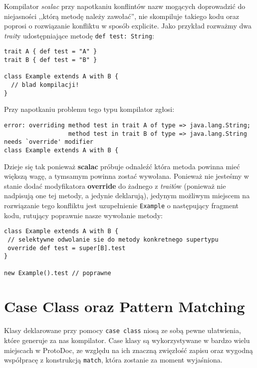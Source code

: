 Kompilator \textit{scalac} przy napotkaniu konflintów nazw mogących doprowadzić do niejasności ,,którą metodę należy zawołać'', nie skompiluje takiego kodu
oraz poprosi o rozwiązanie konfliktu w sposób explicite. Jako przykład rozważmy dwa \textit{trait}y udostępniające metodę \verb|def test: String|:

\begin{lstlisting}
trait A { def test = "A" }
trait B { def test = "B" }

class Example extends A with B {
  // blad kompilacji!
}
\end{lstlisting}

Przy napotkaniu problemu tego typu kompilator zgłosi:
\begin{verbatim}
error: overriding method test in trait A of type => java.lang.String;
                  method test in trait B of type => java.lang.String needs `override' modifier
class Example extends A with B {
\end{verbatim}

Dzieje się tak ponieważ \textbf{scalac} próbuje odnaleźć która metoda powinna mieć większą wagę, a tymsamym powinna zostać wywołana.
Ponieważ nie jesteśmy w stanie dodać modyfikatora \textbf{override} do żadnego z \textit{trait}ów (ponieważ nie nadpisują one tej metody, a jedynie deklarują),
jedynym możliwym miejscem na rozwiązanie tego konfliktu jest uzupełnienie \verb|Example| o następujący fragment kodu, rutujący poprawnie nasze wywołanie metody:

\begin{lstlisting}
class Example extends A with B {
 // selektywne odwolanie sie do metody konkretnego supertypu
 override def test = super[B].test
}

new Example().test // poprawne
\end{lstlisting}

\section{Case Class oraz Pattern Matching}
\label{sec:caseclass}

Klasy deklarowane przy pomocy \verb|case class| niosą ze sobą pewne ułatwienia, które generuje za nas kompilator.
Case klasy są wykorzystywane w bardzo wielu miejscach w ProtoDoc, ze względu na ich znaczną zwięzłość zapisu oraz wygodną współpracę z konstrukcją
\verb|match|, która zostanie za moment wyjaśniona.

